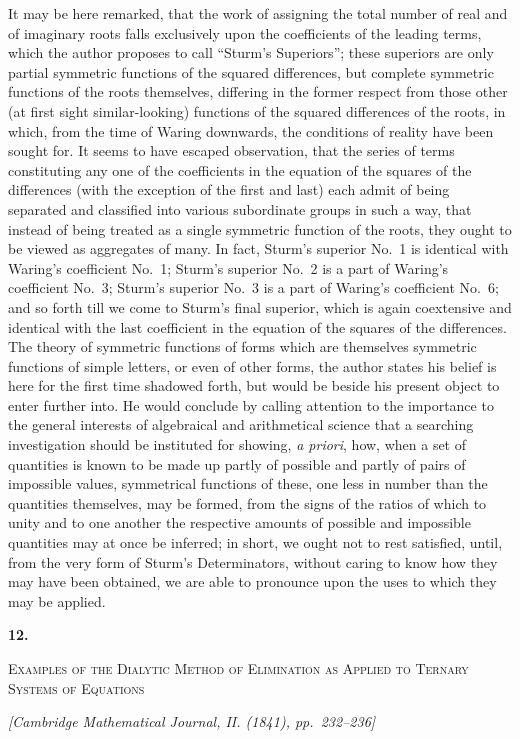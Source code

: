 \documentclass[11pt]{article}
\newcommand{\paperhead}[3]{%
  \clearpage
  \begin{center}
  {\Large\bfseries #1.}\par\vspace{0.85em}
  {\large\scshape #2}\par\vspace{0.6em}
  {\itshape [#3]}\par
  \end{center}\vspace{0.4em}}
\newcommand{\sourcepage}[1]{\marginpar{\scriptsize p.~#1}}
\begin{document}
\sourcepage{60}
It may be here remarked, that the work of assigning the total number of real and of imaginary roots falls exclusively upon the coefficients of the leading terms, which the author proposes to call ``Sturm's Superiors''; these superiors are only partial symmetric functions of the squared differences, but complete symmetric functions of the roots themselves, differing in the former respect from those other (at first sight similar-looking) functions of the squared differences of the roots, in which, from the time of Waring downwards, the conditions of reality have been sought for. It seems to have escaped observation, that the series of terms constituting any one of the coefficients in the equation of the squares of the differences (with the exception of the first and last) each admit of being separated and classified into various subordinate groups in such a way, that instead of being treated as a single symmetric function of the roots, they ought to be viewed as aggregates of many. In fact, Sturm's superior No.~1 is identical with Waring's coefficient No.~1; Sturm's superior No.~2 is a part of Waring's coefficient No.~3; Sturm's superior No.~3 is a part of Waring's coefficient No.~6; and so forth till we come to Sturm's final superior, which is again coextensive and identical with the last coefficient in the equation of the squares of the differences. The theory of symmetric functions of forms which are themselves symmetric functions of simple letters, or even of other forms, the author states his belief is here for the first time shadowed forth, but would be beside his present object to enter further into. He would conclude by calling attention to the importance to the general interests of algebraical and arithmetical science that a searching investigation should be instituted for showing, \emph{a priori}, how, when a set of quantities is known to be made up partly of possible and partly of pairs of impossible values, symmetrical functions of these, one less in number than the quantities themselves, may be formed, from the signs of the ratios of which to unity and to one another the respective amounts of possible and impossible quantities may at once be inferred; in short, we ought not to rest satisfied, until, from the very form of Sturm's Determinators, without caring to know how they may have been obtained, we are able to pronounce upon the uses to which they may be applied.

\paperhead{12}{Examples of the Dialytic Method of Elimination as Applied to Ternary Systems of Equations}{Cambridge Mathematical Journal, II. (1841), pp.~232--236}
\end{document}
